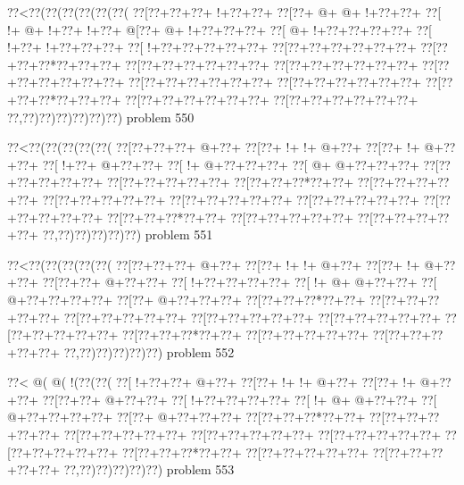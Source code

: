 \vbox{\vbox{\goo
\0??<\0??(\0??(\0??(\0??(\0??(\0??(
\0??[\0??+\0??+\0??+\- !+\0??+\0??+
\0??[\0??+\- @+\- @+\- !+\0??+\0??+
\0??[\- !+\- @+\- !+\0??+\- !+\0??+
\- @[\0??+\- @+\- !+\0??+\0??+\0??+
\0??[\- @+\- !+\0??+\0??+\0??+\0??+
\0??[\- !+\0??+\- !+\0??+\0??+\0??+
\0??[\- !+\0??+\0??+\0??+\0??+\0??+
\0??[\0??+\0??+\0??+\0??+\0??+\0??+
\0??[\0??+\0??+\0??*\0??+\0??+\0??+
\0??[\0??+\0??+\0??+\0??+\0??+\0??+
\0??[\0??+\0??+\0??+\0??+\0??+\0??+
\0??[\0??+\0??+\0??+\0??+\0??+\0??+
\0??[\0??+\0??+\0??+\0??+\0??+\0??+
\0??[\0??+\0??+\0??+\0??+\0??+\0??+
\0??[\0??+\0??+\0??*\0??+\0??+\0??+
\0??[\0??+\0??+\0??+\0??+\0??+\0??+
\0??[\0??+\0??+\0??+\0??+\0??+\0??+
\0??,\0??)\0??)\0??)\0??)\0??)\0??)
}
\hfil problem 550\hfil\break
}

\vbox{\vbox{\goo
\0??<\0??(\0??(\0??(\0??(\0??(
\0??[\0??+\0??+\0??+\- @+\0??+
\0??[\0??+\- !+\- !+\- @+\0??+
\0??[\0??+\- !+\- @+\0??+\0??+
\0??[\- !+\0??+\- @+\0??+\0??+
\0??[\- !+\- @+\0??+\0??+\0??+
\0??[\- @+\- @+\0??+\0??+\0??+
\0??[\0??+\0??+\0??+\0??+\0??+
\0??[\0??+\0??+\0??+\0??+\0??+
\0??[\0??+\0??+\0??*\0??+\0??+
\0??[\0??+\0??+\0??+\0??+\0??+
\0??[\0??+\0??+\0??+\0??+\0??+
\0??[\0??+\0??+\0??+\0??+\0??+
\0??[\0??+\0??+\0??+\0??+\0??+
\0??[\0??+\0??+\0??+\0??+\0??+
\0??[\0??+\0??+\0??*\0??+\0??+
\0??[\0??+\0??+\0??+\0??+\0??+
\0??[\0??+\0??+\0??+\0??+\0??+
\0??,\0??)\0??)\0??)\0??)\0??)
}
\hfil problem 551\hfil\break
}

\vbox{\vbox{\goo
\0??<\0??(\0??(\0??(\0??(\0??(
\0??[\0??+\0??+\0??+\- @+\0??+
\0??[\0??+\- !+\- !+\- @+\0??+
\0??[\0??+\- !+\- @+\0??+\0??+
\0??[\0??+\0??+\- @+\0??+\0??+
\0??[\- !+\0??+\0??+\0??+\0??+
\0??[\- !+\- @+\- @+\0??+\0??+
\0??[\- @+\0??+\0??+\0??+\0??+
\0??[\0??+\- @+\0??+\0??+\0??+
\0??[\0??+\0??+\0??*\0??+\0??+
\0??[\0??+\0??+\0??+\0??+\0??+
\0??[\0??+\0??+\0??+\0??+\0??+
\0??[\0??+\0??+\0??+\0??+\0??+
\0??[\0??+\0??+\0??+\0??+\0??+
\0??[\0??+\0??+\0??+\0??+\0??+
\0??[\0??+\0??+\0??*\0??+\0??+
\0??[\0??+\0??+\0??+\0??+\0??+
\0??[\0??+\0??+\0??+\0??+\0??+
\0??,\0??)\0??)\0??)\0??)\0??)
}
\hfil problem 552\hfil\break
}

\vbox{\vbox{\goo
\0??<\- @(\- @(\- !(\0??(\0??(
\0??[\- !+\0??+\0??+\- @+\0??+
\0??[\0??+\- !+\- !+\- @+\0??+
\0??[\0??+\- !+\- @+\0??+\0??+
\0??[\0??+\0??+\- @+\0??+\0??+
\0??[\- !+\0??+\0??+\0??+\0??+
\0??[\- !+\- @+\- @+\0??+\0??+
\0??[\- @+\0??+\0??+\0??+\0??+
\0??[\0??+\- @+\0??+\0??+\0??+
\0??[\0??+\0??+\0??*\0??+\0??+
\0??[\0??+\0??+\0??+\0??+\0??+
\0??[\0??+\0??+\0??+\0??+\0??+
\0??[\0??+\0??+\0??+\0??+\0??+
\0??[\0??+\0??+\0??+\0??+\0??+
\0??[\0??+\0??+\0??+\0??+\0??+
\0??[\0??+\0??+\0??*\0??+\0??+
\0??[\0??+\0??+\0??+\0??+\0??+
\0??[\0??+\0??+\0??+\0??+\0??+
\0??,\0??)\0??)\0??)\0??)\0??)
}
\hfil problem 553\hfil\break
}

